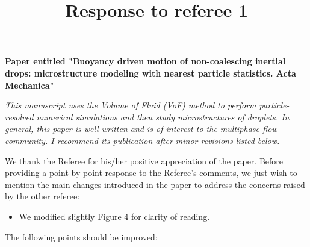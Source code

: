 \documentclass[10pt,a4paper]{article}
\begin{document}
\title{Response to referee 1} 
\maketitle
\textbf{Paper entitled "Buoyancy driven motion of non-coalescing inertial drops: microstructure modeling with nearest particle statistics.
Acta Mechanica"}
\bigskip

\textit{This manuscript uses the Volume of Fluid (VoF) method to perform particle-resolved numerical simulations and then study microstructures of droplets. In general, this paper is well-written and is of interest to the multiphase flow community. I recommend its publication after minor revisions listed below.}


\color{blue}
We thank the Referee for his/her positive appreciation of the paper. 
Before providing a point-by-point response to the Referee’s comments, we just wish to mention the main changes 
introduced in the paper to address the concerns raised by the other referee: 
\begin{itemize}
    \item  We modified slightly Figure 4 for clarity of reading. 
\end{itemize}


The following points should be improved:
\end{document}
